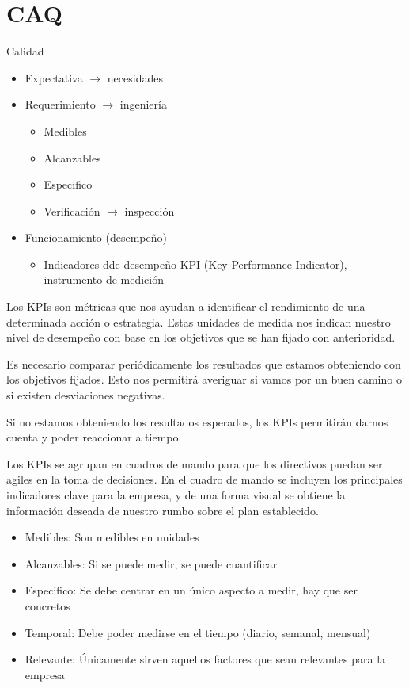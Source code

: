 \section{CAQ}

Calidad 
\begin{itemize}
    \item Expectativa \( \to \) necesidades
    
    \item Requerimiento \( \to \) ingeniería 
        \begin{itemize}
            \item Medibles 
            \item Alcanzables
            \item Especifico 
            \item Verificación \( \to \) inspección
        \end{itemize}
    \item Funcionamiento (desempeño)
        \begin{itemize}
            \item Indicadores dde desempeño KPI (Key Performance Indicator), instrumento de medición
        \end{itemize}
\end{itemize} 

Los KPIs son métricas que nos ayudan a identificar el rendimiento de una determinada acción o estrategia. Estas unidades de medida nos indican nuestro nivel de desempeño con base en los objetivos que se han fijado con anterioridad. 

Es necesario comparar periódicamente los resultados que estamos obteniendo con los objetivos fijados. Esto nos permitirá averiguar si vamos por un buen camino o si existen desviaciones negativas. 

Si no estamos obteniendo los resultados esperados, los KPIs permitirán darnos cuenta y poder reaccionar a tiempo.

Los KPIs se agrupan en cuadros de mando para que los directivos puedan ser agiles en la toma de decisiones. En el cuadro de mando se incluyen los principales indicadores clave para la empresa, y de una forma visual se obtiene la información deseada de nuestro rumbo sobre el plan establecido. 

\begin{itemize}
    \item Medibles: Son medibles en unidades
    \item Alcanzables: Si se puede medir, se puede cuantificar
    \item Especifico: Se debe centrar en un único aspecto a medir, hay que ser concretos
    \item Temporal: Debe poder medirse en el tiempo (diario, semanal, mensual)
    \item Relevante: Únicamente sirven aquellos factores que sean relevantes para la empresa
\end{itemize}


